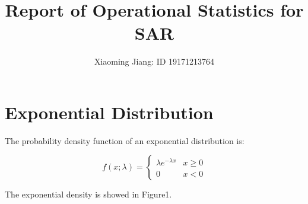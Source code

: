 \documentclass{book} %
\begin{document}
 
\title{Report of Operational Statistics for SAR }  %
\author{Xiaoming Jiang: ID 19171213764} %
\maketitle  %
\newcommand\NAME{Carl Kingsford}  %
\newcommand\ANDREWID{ckingsf}     %
\newcommand\HWNUM{}
\section{Exponential Distribution}
\setlength{\parindent}{2em}
The probability density function  of an exponential distribution is:
\begin{center}
	\begin{equation}
	f(x;\lambda)=
	\begin{cases}
	\lambda e^{-\lambda x}& \text{$x\geq $0}\\
	0& \text{$x < $0}
	\end{cases}
	\end{equation} 
\end{center}
The exponential density is showed in Figure1. 
\end{document}
